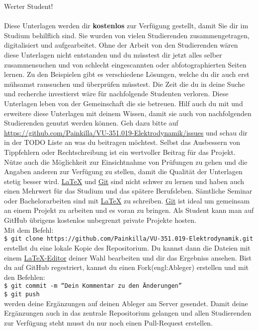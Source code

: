 \newpage %
	Werter Student!\\
	\\
	Diese Unterlagen werden dir \textbf{kostenlos} zur Verfügung gestellt, damit Sie dir im Studium behilflich sind.
	Sie wurden von vielen Studierenden zusammengetragen, digitalisiert und aufgearbeitet.
	Ohne der Arbeit von den Studierenden wären diese Unterlagen nicht entstanden und du müsstest dir jetzt alles selber zusammensuchen und von schlecht eingescannten oder abfotographierten Seiten lernen.
	Zu den Beispielen gibt es verschiedene Lösungen, welche du dir auch erst mühsamst raussuchen und überprüfen müsstest.
	Die Zeit die du in deine Suche und recherche investierst wäre für nachfolgende Studenten verloren. Diese Unterlagen leben von der Gemeinschaft die sie betreuen.
	Hilf auch du mit und erweitere diese Unterlagen mit deinem Wissen, damit sie auch von nachfolgenden Studierenden genutzt werden können.
	Geh dazu bitte auf \href{https://github.com/Painkilla/VU-351.019-Elektrodynamik/issues}{https://github.com/Painkilla/VU-351.019-Elektrodynamik/issues} und schau dir in der TODO Liste an was du beitragen möchtest.
	Selbst das Ausbessern von Tippfehlern oder Rechtschreibung ist ein wertvoller Beitrag für das Projekt. Nütze auch die Möglichkeit zur Einsichtnahme von Prüfungen zu gehen und die Angaben anderen zur Verfügung zu stellen, damit die Qualität der Unterlagen stetig besser wird.
	\href{https://www.latex-project.org/get/}{\LaTeX} und \href{https://git-scm.com/downloads}{Git} sind nicht schwer zu lernen und haben auch einen Mehrwert für das Studium und das spätere Berufsleben.
	Sämtliche Seminar oder Bachelorarbeiten sind mit \href{https://www.latex-project.org/get/}{\LaTeX} zu schreiben. \href{https://git-scm.com/downloads}{Git} ist ideal um gemeinsam an einem Projekt zu arbeiten und es voran zu bringen.
	Als Student kann man auf GitHub übrigens kostenlos unbegrenzt private Projekte hosten.\\
	Mit dem Befehl:\\
	\texttt{\$ git clone https://github.com/Painkilla/VU-351.019-Elektrodynamik.git}\\
	erstellst du eine lokale Kopie des Repositorium. Du kannst dann die Dateien mit einem \href{https://www.latex-project.org/get/}{\LaTeX-Editor} deiner Wahl bearbeiten und dir das Ergebniss ansehen.
	Bist du auf GitHub regestriert, kannst du einen Fork(engl:Ableger) erstellen und mit den Befehlen:\\
	\texttt{\$ git commit -m ``Dein Kommentar zu den Änderungen''}\\
	\texttt{\$ git push}\\
	werden deine Ergänzungen auf deinen Ableger am Server gesendet. Damit deine Ergänzungen auch in das zentrale Repositorium gelangen und allen Studierenden zur Verfügung steht musst du nur noch einen Pull-Request erstellen.
	\newpage